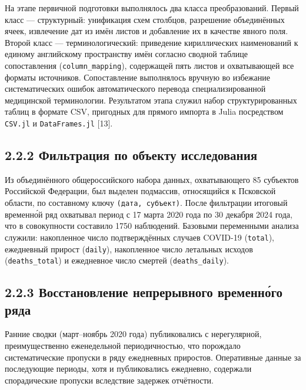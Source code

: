 \documentclass[12pt]{article}
\begin{document}
На этапе первичной подготовки выполнялось два класса преобразований.
Первый класс --- структурный: унификация схем столбцов, разрешение
объединённых ячеек, извлечение дат из имён листов и добавление их в
качестве явного поля. Второй класс --- терминологический: приведение
кириллических наименований к единому английскому пространству имён
согласно сводной таблице сопоставления (\texttt{column\_mapping}),
содержащей пять листов и охватывающей все форматы источников.
Сопоставление выполнялось вручную во избежание систематических ошибок
автоматического перевода специализированной медицинской терминологии.
Результатом этапа служил набор структурированных таблиц в формате CSV,
пригодных для прямого импорта в Julia посредством \texttt{CSV.jl} и
\texttt{DataFrames.jl} {[}13{]}.

\subsection{2.2.2 Фильтрация по объекту
исследования}\label{ux444ux438ux43bux44cux442ux440ux430ux446ux438ux44f-ux43fux43e-ux43eux431ux44aux435ux43aux442ux443-ux438ux441ux441ux43bux435ux434ux43eux432ux430ux43dux438ux44f}

Из объединённого общероссийского набора данных, охватывающего 85
субъектов Российской Федерации, был выделен подмассив, относящийся к
Псковской области, по составному ключу \texttt{(дата,\ субъект)}. После
фильтрации итоговый временно́й ряд охватывал период с 17 марта 2020 года
по 30 декабря 2024 года, что в совокупности составило 1750 наблюдений.
Базовыми переменными анализа служили: накопленное число подтверждённых
случаев COVID-19 (\texttt{total}), ежедневный прирост (\texttt{daily}),
накопленное число летальных исходов (\texttt{deaths\_total}) и
ежедневное число смертей (\texttt{deaths\_daily}).

\subsection{2.2.3 Восстановление непрерывного временно́го
ряда}\label{ux432ux43eux441ux441ux442ux430ux43dux43eux432ux43bux435ux43dux438ux435-ux43dux435ux43fux440ux435ux440ux44bux432ux43dux43eux433ux43e-ux432ux440ux435ux43cux435ux43dux43dux43eux433ux43e-ux440ux44fux434ux430}

Ранние сводки (март--ноябрь 2020 года) публиковались с нерегулярной,
преимущественно еженедельной периодичностью, что порождало
систематические пропуски в ряду ежедневных приростов. Оперативные данные
за последующие периоды, хотя и публиковались ежедневно, содержали
спорадические пропуски вследствие задержек отчётности.
\end{document}
